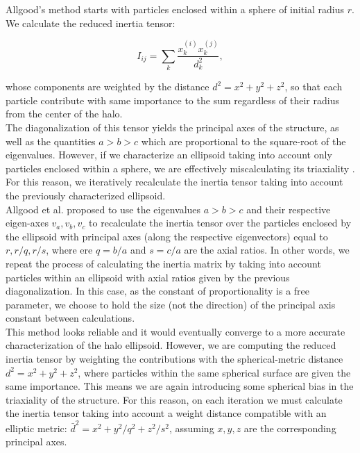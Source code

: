 Allgood's method starts with particles enclosed within a sphere of initial radius $r$. We calculate the reduced inertia tensor:

\begin{equation}
I_{ij} = \sum_k \frac{x_k^{(i)}x_k^{(j)}}{d^2_k},
\label{eq:inertia}
\end{equation}

whose components are weighted by the distance $d^2=x^2+y^2+z^2$, so that each particle contribute with same importance to the sum regardless of their radius from the center of the halo.\\

The diagonalization of this tensor yields the principal axes of the structure, as well as the quantities $a>b>c$ which are proportional to the square-root of the eigenvalues. However, if we characterize an ellipsoid taking into account only particles enclosed within a sphere, we are effectively miscalculating its triaxiality \cite{Allgood_et_al._2006}. For this reason, we iteratively recalculate the inertia tensor taking into account the previously characterized ellipsoid.\\

Allgood et al. proposed to use the eigenvalues $a>b>c$ and their respective eigen-axes $v_a,v_b,v_c$ to recalculate the inertia tensor over the particles enclosed by the ellipsoid with principal axes (along the respective eigenvectors) equal to $r,r/q,r/s$, where ere $q = b/a$ and $s=c/a$ are the axial ratios. In other words, we repeat the process of calculating the inertia matrix by taking into account particles within an ellipsoid with axial ratios given by the previous diagonalization. In this case, as the constant of proportionality is a free parameter, we choose to hold the size (not the direction) of the principal axis constant between calculations.\\

This method looks reliable and it would eventually converge to a more accurate characterization of the halo ellipsoid. However, we are computing the reduced inertia tensor by weighting the contributions with the spherical-metric distance $d^2=x^2+y^2+z^2$, where particles within the same spherical surface are given the same importance. This means we are again introducing some spherical bias in the triaxiality of the structure. For this reason, on each iteration we must calculate the inertia tensor taking into account a weight distance compatible with an elliptic metric: $\bar{d}^2 = x^2+y^2/q^2+z^2/s^2$, assuming $x,y,z$ are the corresponding principal axes.\\

